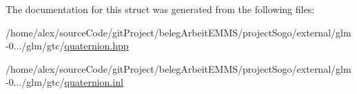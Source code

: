 The documentation for this struct was generated from the following files\-:\begin{DoxyCompactItemize}
\item 
/home/alex/source\-Code/git\-Project/beleg\-Arbeit\-E\-M\-M\-S/project\-Sogo/external/glm-\/0.../glm/gtc/\hyperlink{quaternion_8hpp}{quaternion.\-hpp}\item 
/home/alex/source\-Code/git\-Project/beleg\-Arbeit\-E\-M\-M\-S/project\-Sogo/external/glm-\/0.../glm/gtc/\hyperlink{quaternion_8inl}{quaternion.\-inl}\end{DoxyCompactItemize}
